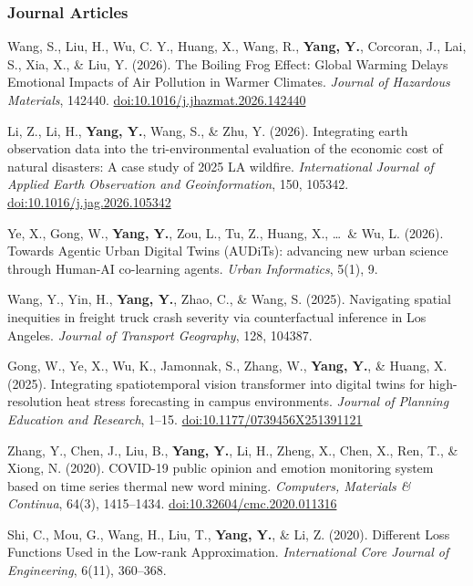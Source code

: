 \documentclass[10pt,letterpaper]{article}
\newenvironment{reflist}
  {\begin{list}{}{%
     \setlength{\leftmargin}{1.7em}\setlength{\itemindent}{-1.7em}%
     \setlength{\itemsep}{0.22em}\setlength{\parsep}{0pt}\setlength{\topsep}{0.25em}}}
  {\end{list}}
\begin{document}
\subsubsection{Journal Articles}
\begin{reflist}
  \item[] [1] Wang, S., Liu, H., Wu, C. Y., Huang, X., Wang, R., \textbf{Yang, Y.}, Corcoran, J., Lai, S., Xia, X., \& Liu, Y. (2026). The Boiling Frog Effect: Global Warming Delays Emotional Impacts of Air Pollution in Warmer Climates. \textit{Journal of Hazardous Materials}, 142440. \href{https://doi.org/10.1016/j.jhazmat.2026.142440}{doi:10.1016/j.jhazmat.2026.142440}
  \item[] [2] Li, Z., Li, H., \textbf{Yang, Y.}, Wang, S., \& Zhu, Y. (2026). Integrating earth observation data into the tri-environmental evaluation of the economic cost of natural disasters: A case study of 2025 LA wildfire. \textit{International Journal of Applied Earth Observation and Geoinformation}, 150, 105342. \href{https://doi.org/10.1016/j.jag.2026.105342}{doi:10.1016/j.jag.2026.105342}
  \item[] [3] Ye, X., Gong, W., \textbf{Yang, Y.}, Zou, L., Tu, Z., Huang, X., \ldots\ \& Wu, L. (2026). Towards Agentic Urban Digital Twins (AUDiTs): advancing new urban science through Human-AI co-learning agents. \textit{Urban Informatics}, 5(1), 9.
  \item[] [4] Wang, Y., Yin, H., \textbf{Yang, Y.}, Zhao, C., \& Wang, S. (2025). Navigating spatial inequities in freight truck crash severity via counterfactual inference in Los Angeles. \textit{Journal of Transport Geography}, 128, 104387.
  \item[] [5] Gong, W., Ye, X., Wu, K., Jamonnak, S., Zhang, W., \textbf{Yang, Y.}, \& Huang, X. (2025). Integrating spatiotemporal vision transformer into digital twins for high-resolution heat stress forecasting in campus environments. \textit{Journal of Planning Education and Research}, 1--15. \href{https://doi.org/10.1177/0739456X251391121}{doi:10.1177/0739456X251391121}
  \item[] [6] Zhang, Y., Chen, J., Liu, B., \textbf{Yang, Y.}, Li, H., Zheng, X., Chen, X., Ren, T., \& Xiong, N. (2020). COVID-19 public opinion and emotion monitoring system based on time series thermal new word mining. \textit{Computers, Materials \& Continua}, 64(3), 1415--1434. \href{https://doi.org/10.32604/cmc.2020.011316}{doi:10.32604/cmc.2020.011316}
  \item[] [7] Shi, C., Mou, G., Wang, H., Liu, T., \textbf{Yang, Y.}, \& Li, Z. (2020). Different Loss Functions Used in the Low-rank Approximation. \textit{International Core Journal of Engineering}, 6(11), 360--368.
\end{reflist}
\end{document}
